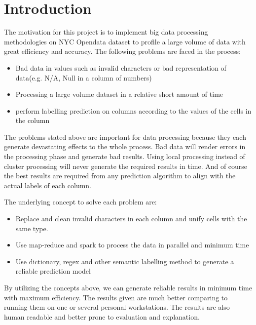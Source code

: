 \documentclass[sigconf]{acmart}
\begin{document}
\section{Introduction}
The motivation for this project is to implement big data processing methodologies on NYC Opendata dataset to profile a large volume of data with great efficiency and accuracy. The following problems are faced in the process:
\begin{itemize}
    \item Bad data in values such as invalid characters or bad representation of data(e.g. N/A, Null in a column of numbers)
    \item Processing a large volume dataset in a relative short amount of time
    \item perform labelling prediction on columns according to the values of the cells in the column
\end{itemize}

The problems stated above are important for data processing because they each generate devastating effects to the whole process. Bad data will render errors in the processing phase and generate bad results. Using local processing instead of cluster processing will never generate the required results in time. And of course the best results are required from any prediction algorithm to align with the actual labels of each column.

The underlying concept to solve each problem are:
\begin{itemize}
    \item Replace and clean invalid characters in each column and unify cells with the same type. 
    \item Use map-reduce and spark to process the data in parallel and minimum time
    \item Use dictionary, regex and other semantic labelling method to generate a reliable prediction model
\end{itemize}

By utilizing the concepts above, we can generate reliable results in minimum time with maximum efficiency. The results given are much better comparing to running them on one or several personal workstations. The results are also human readable and better prone to evaluation and explanation.


\end{document}

